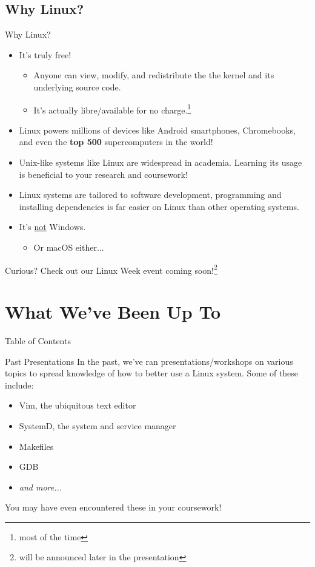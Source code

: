 \documentclass{beamer}
\begin{document}
\subsection{Why Linux?}
\begin{frame}{Why Linux?}
	\begin{itemize}
		\item It's truly free!
		      \pause
		      \begin{itemize}
			      \item Anyone can view, modify, and redistribute
			            the the kernel and its underlying
			            source code.
			            \pause
			      \item It's actually libre/available for no
			            charge.\footnote{most of the time}
			            \pause
		      \end{itemize}
		\item Linux powers millions of devices like Android
		      smartphones, Chromebooks, and even the \textbf{top 500}
		      supercomputers in the world!
		      \pause
		\item Unix-like systems like Linux are widespread in academia.
		      Learning its usage is beneficial to your research and
		      coursework!
		      \pause
		\item Linux systems are tailored to software development,
		      programming and installing dependencies is far easier
		      on Linux than other operating systems.
		      \pause
		\item It's \underline{not} Windows.
		      \pause
		      \begin{itemize}
			      \item Or macOS either...
		      \end{itemize}
		      \pause
	\end{itemize}
	Curious? Check out our Linux Week event coming soon!\footnote{will be
		announced later in the presentation}
\end{frame}

\section{What We've Been Up To}
\begin{frame}{Table of Contents}
	\tableofcontents[currentsection]
\end{frame}

\begin{frame}{Past Presentations}
	In the past, we've ran presentations/workshops on various topics to
	spread knowledge of how to better use a Linux system. Some of these
	include:
	\pause
	\begin{itemize}
		\item Vim, the ubiquitous text editor
		      \pause
		\item SystemD, the system and service manager
		      \pause
		\item Makefiles
		      \pause
		\item GDB
		      \pause
		\item \textit{and more...}
		      \pause
	\end{itemize}
	You may have even encountered these in your coursework!
\end{frame}
\end{document}
